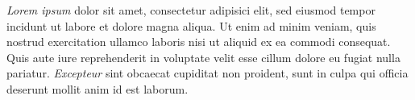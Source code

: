 \emph{Lorem ipsum} dolor sit amet, consectetur adipisici elit, sed eiusmod tempor incidunt ut labore et dolore magna aliqua. Ut enim ad minim veniam, quis nostrud exercitation ullamco laboris nisi ut aliquid ex ea commodi consequat. Quis aute iure reprehenderit in voluptate velit esse cillum dolore eu fugiat nulla pariatur. \emph{Excepteur} sint obcaecat cupiditat non proident, sunt in culpa qui officia deserunt mollit anim id est laborum.

